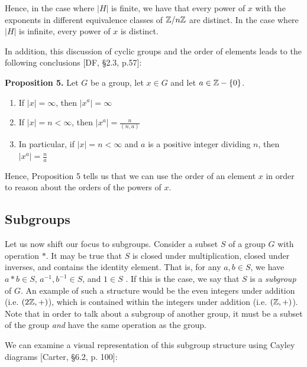 \documentclass[11pt, reqno]{amsart}
\theoremstyle{plain}
\theoremstyle{definition}
\theoremstyle{example}
\begin{document}
Hence, in the case where $|H|$ is finite, we have that every power of $x$ with the exponents in different equivalence classes of $\mathbb{Z}/n\mathbb{Z}$ are distinct. In the case where $|H|$ is infinite, every power of $x$ is distinct.

\par
In addition, this discussion of cyclic groups and the order of elements leads to the following conclusions [DF, \S 2.3, p.57]:

\par
\textbf{Proposition 5.} Let $G$ be a group, let $x \in G$ and let $a \in \mathbb{Z} - \{0\}$.
\begin{enumerate}

\item If $|x| = \infty$, then $|x^a| = \infty$

\item If $|x| = n < \infty$, then $|x^a| = \frac{n}{(n, a)}$

\item In particular, if $|x| = n < \infty$ and $a$ is a positive integer dividing $n$, then $|x^a| = \frac{n}{a}$
\end{enumerate}

\par
Hence, Proposition 5 tells us that we can use the order of an element $x$ in order to reason about the orders of the powers of $x$.

\subsection{Subgroups}

\par
Let us now shift our focus to subgroups. Consider a subset $S$ of a group $G$ with operation $*$. It may be true that $S$ is closed under multiplication, closed under inverses, and contains the identity element. That is, for any $a, b \in S$, we have $a * b \in S$, $a^{-1}, b^{-1} \in S$, and $1 \in S$ \cite{pinter}. If this is the case, we say that $S$ is a \textit{subgroup} of $G$. An example of such a structure would be the even integers under addition (i.e. $(2\mathbb{Z}, +)$), which is contained within the integers under addition (i.e. $(\mathbb{Z}, +)$). Note that in order to talk about a subgroup of another group, it must be a subset of the group \textit{and} have the same operation as the group. 

\par
We can examine a visual representation of this subgroup structure using Cayley diagrams [Carter, \S 6.2, p. 100]:
\end{document}
